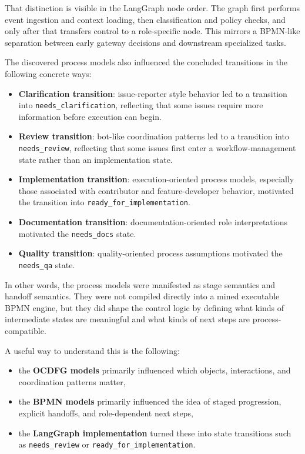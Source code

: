 \documentclass[11pt,a4paper]{article}
\begin{document}
That distinction is visible in the LangGraph node order. The graph first performs event ingestion and context loading, then classification and policy checks, and only after that transfers control to a role-specific node. This mirrors a BPMN-like separation between early gateway decisions and downstream specialized tasks.

The discovered process models also influenced the concluded transitions in the following concrete ways:
\begin{itemize}
    \item \textbf{Clarification transition}: issue-reporter style behavior led to a transition into \texttt{needs\_clarification}, reflecting that some issues require more information before execution can begin.
    \item \textbf{Review transition}: bot-like coordination patterns led to a transition into \texttt{needs\_review}, reflecting that some issues first enter a workflow-management state rather than an implementation state.
    \item \textbf{Implementation transition}: execution-oriented process models, especially those associated with contributor and feature-developer behavior, motivated the transition into \texttt{ready\_for\_implementation}.
    \item \textbf{Documentation transition}: documentation-oriented role interpretations motivated the \texttt{needs\_docs} state.
    \item \textbf{Quality transition}: quality-oriented process assumptions motivated the \texttt{needs\_qa} state.
\end{itemize}

In other words, the process models were manifested as stage semantics and handoff semantics. They were not compiled directly into a mined executable BPMN engine, but they did shape the control logic by defining what kinds of intermediate states are meaningful and what kinds of next steps are process-compatible.

A useful way to understand this is the following:
\begin{itemize}
    \item the \textbf{OCDFG models} primarily influenced which objects, interactions, and coordination patterns matter,
    \item the \textbf{BPMN models} primarily influenced the idea of staged progression, explicit handoffs, and role-dependent next steps,
    \item the \textbf{LangGraph implementation} turned these into state transitions such as \texttt{needs\_review} or \texttt{ready\_for\_implementation}.
\end{itemize}
\end{document}
